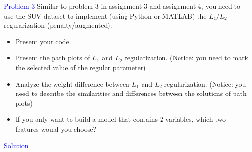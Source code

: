 \textcolor{blue}{Problem 3}
Similar to problem $3$ in assignment $3$ and assignment $4$, you need to use the SUV dataset to implement (using Python or MATLAB) the $L_1$/$L_2$ regularization (penalty/augmented).
\begin{itemize}
    \item Present your code.
    \item Present the path plots of $L_1$ and $L_2$ regularization. (Notice: you need to mark the selected value of the regular parameter)
    \item Analyze the weight difference between $L_1$ and $L_2$ regularization. (Notice: you need to describe the similarities and differences between the solutions of path plots)
    \item If you only want to build a model that contains $2$ variables, which two features would you choose?
\end{itemize}

\textcolor{blue}{Solution}\\











